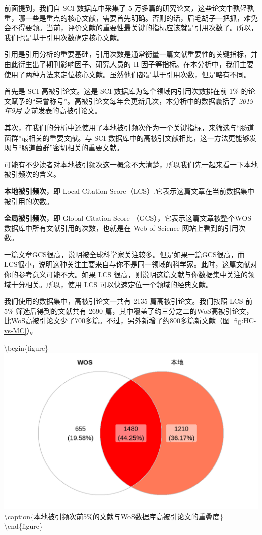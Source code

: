 \documentclass[]{ctexbook}
\begin{document}
前面提到，我们自 SCI 数据库中采集了 5 万多篇的研究论文，这些论文中孰轻孰重，哪一些是重点的核心文献，需要首先明确。否则的话，眉毛胡子一把抓，难免会不得要领。当前，评价文献的重要性最关键的指标应该就是引用次数了。所以，我们也是基于引用次数确定核心文献。

引用是引用分析的重要基础，引用次数是通常衡量一篇文献重要性的关键指标，并由此衍生出了期刊影响因子、研究人员的 H 因子等指标。在本分析中，我们主要使用了两种方法来定位核心文献。虽然他们都是基于引用次数，但是略有不同。

首先是 SCI 高被引论文。这是 SCI 数据库为每个领域内引用次数排在前 1\% 的论文赋予的``荣誉称号''。高被引论文每年会更新几次，本分析中的数据囊括了 \emph{2019年9月} 之前发表的高被引论文。

其次，在我们的分析中还使用了本地被引频次作为一个关键指标，来筛选与``肠道菌群''最相关的重要文献。与 SCI 数据库中的高被引文献相比，这一方法更能够发现与``肠道菌群''密切相关的重要文献。

可能有不少读者对本地被引频次这一概念不大清楚，所以我们先一起来看一下本地被引频次的含义。

\textbf{本地被引频次}，即 Local Citation Score（LCS）,它表示这篇文章在当前数据集中被引用的次数。

\textbf{全局被引频次}，即 Global Citation Score （GCS），它表示这篇文章被整个WOS数据库中所有文献引用的次数，也就是在 Web of Science 网站上看到的引用次数。

一篇文章GCS很高，说明被全球科学家关注较多。但是如果一篇GCS很高，而LCS很小，说明这种关注主要来自与你不是同一领域的科学家。此时，这篇文献对你的参考意义可能不大。如果 LCS 很高，则说明这篇文献与你数据集中关注的领域十分相关。所以，使用 LCS 可以快速定位一个领域的经典文献。

我们使用的数据集中，高被引论文一共有 2135 篇高被引论文。我们按照 LCS 前 5\% 筛选后得到的文献共有 2690 篇，其中覆盖了约三分之二的WoS高被引论文，比WoS高被引论文少了700多篇。不过，另外新增了约800多篇新文献（图 \ref{fig:HC-vs-MC}）。

\textbackslash begin\{figure\}
\includegraphics[width=0.5\linewidth]{plots/HC-vs-MC-1} \textbackslash caption\{本地被引频次前5\%的文献与WoS数据库高被引论文的重叠度\}\label{fig:HC-vs-MC}
\textbackslash end\{figure\}
\end{document}
